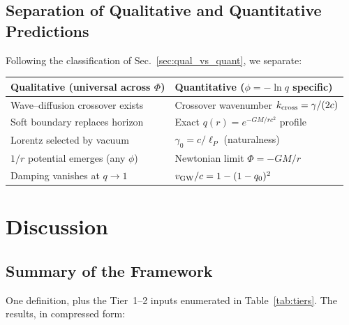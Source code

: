 \documentclass[aps,prd,twocolumn,showpacs,superscriptaddress,preprintnumbers]{revtex4-2}
\begin{document}
\subsection{Separation of Qualitative and Quantitative Predictions}

Following the classification of Sec.~\ref{sec:qual_vs_quant}, we separate:

\begin{center}
\begin{tabular}{p{}p{}}
\toprule
\textbf{Qualitative (universal across $\Phi$)} & \textbf{Quantitative ($\phi=-\ln q$ specific)} \\
\midrule
Wave--diffusion crossover exists & Crossover wavenumber $k_{\rm cross}=\gamma/(2c)$ \\
Soft boundary replaces horizon & Exact $q(r)=e^{-GM/rc^2}$ profile \\
Lorentz selected by vacuum & $\gamma_0=c/\ell_P$ (naturalness) \\
$1/r$ potential emerges (any $\phi$) & Newtonian limit $\Phi=-GM/r$ \\
Damping vanishes at $q\to1$ & $v_{\rm GW}/c = 1-(1-q_0)^2$ \\
\bottomrule
\end{tabular}
\end{center}

\section{Discussion}
\label{sec:discussion}

\subsection{Summary of the Framework}

One definition, plus the Tier~1--2 inputs enumerated in Table~\ref{tab:tiers}. The results, in compressed form:
\end{document}

